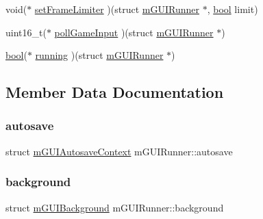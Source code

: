 \begin{DoxyCompactItemize}
\item 
void($\ast$ \mbox{\hyperlink{structm_g_u_i_runner_a8994b3451abfa8120cb659042f577e8e}{set\+Frame\+Limiter}} )(struct \mbox{\hyperlink{structm_g_u_i_runner}{m\+G\+U\+I\+Runner}} $\ast$, \mbox{\hyperlink{libretro_8h_a4a26dcae73fb7e1528214a068aca317e}{bool}} limit)
\item 
uint16\+\_\+t($\ast$ \mbox{\hyperlink{structm_g_u_i_runner_af876f2f38d3d6ef93108cf6e978a3f90}{poll\+Game\+Input}} )(struct \mbox{\hyperlink{structm_g_u_i_runner}{m\+G\+U\+I\+Runner}} $\ast$)
\item 
\mbox{\hyperlink{libretro_8h_a4a26dcae73fb7e1528214a068aca317e}{bool}}($\ast$ \mbox{\hyperlink{structm_g_u_i_runner_a04a152881ed91b1ae07a4e5a8c478370}{running}} )(struct \mbox{\hyperlink{structm_g_u_i_runner}{m\+G\+U\+I\+Runner}} $\ast$)
\end{DoxyCompactItemize}


\subsection{Member Data Documentation}
\mbox{\label{structm_g_u_i_runner_ae240ad533c323de58caba287697c88de}} 
\subsubsection{\texorpdfstring{autosave}{autosave}}
{\footnotesize\ttfamily struct \mbox{\hyperlink{gui-runner_8h_structm_g_u_i_autosave_context}{m\+G\+U\+I\+Autosave\+Context}} m\+G\+U\+I\+Runner\+::autosave}

\mbox{\label{structm_g_u_i_runner_a0f417434c1a9f376e778d385d39953ec}} 
\subsubsection{\texorpdfstring{background}{background}}
{\footnotesize\ttfamily struct \mbox{\hyperlink{gui-runner_8h_structm_g_u_i_background}{m\+G\+U\+I\+Background}} m\+G\+U\+I\+Runner\+::background}

\mbox{\label{structm_g_u_i_runner_acd48b0c2ab368441512307eafc4b91da}} 
